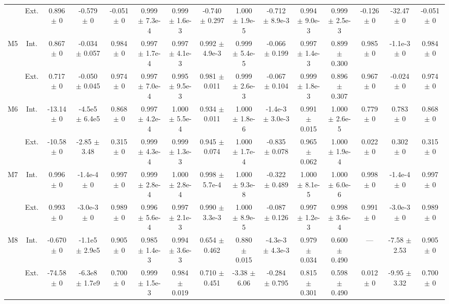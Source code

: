 \begin{table}[htbp]
{\begin{tabular}{@{}ccccccccccccccc@{}}
 & Ext. & 0.896 $\pm$ 0 & -0.579 $\pm$ 0 & -0.051 $\pm$ 0 & 0.999 $\pm$ 7.3e-4 & 0.999 $\pm$ 1.6e-3 & -0.740 $\pm$ 0.297 & 1.000 $\pm$ 1.9e-5 & -0.712 $\pm$ 8.9e-3 & 0.994 $\pm$ 9.0e-3 & 0.999 $\pm$ 2.5e-3 & -0.126 $\pm$ 0 & -32.47 $\pm$ 0 & -0.051 $\pm$ 0 \\
\cline{2-15}
\multirow{2}{*}{M5} & Int. & 0.867 $\pm$ 0 & -0.034 $\pm$ 0.057 & 0.984 $\pm$ 0 & 0.997 $\pm$ 1.7e-4 & 0.997 $\pm$ 4.1e-3 & 0.992 $\pm$ 4.9e-3 & 0.999 $\pm$ 5.4e-5 & -0.066 $\pm$ 0.199 & 0.997 $\pm$ 1.4e-3 & 0.899 $\pm$ 0.300 & 0.985 $\pm$ 0 & -1.1e-3 $\pm$ 0 & 0.984 $\pm$ 0 \\
 & Ext. & 0.717 $\pm$ 0 & -0.050 $\pm$ 0.045 & 0.974 $\pm$ 0 & 0.997 $\pm$ 7.0e-4 & 0.995 $\pm$ 9.5e-3 & 0.981 $\pm$ 0.011 & 0.999 $\pm$ 2.6e-3 & -0.067 $\pm$ 0.104 & 0.999 $\pm$ 1.8e-3 & 0.896 $\pm$ 0.307 & 0.967 $\pm$ 0 & -0.024 $\pm$ 0 & 0.974 $\pm$ 0 \\
\cline{2-15}
\multirow{2}{*}{M6} & Int. & -13.14 $\pm$ 0 & -4.5e5 $\pm$ 6.4e5 & 0.868 $\pm$ 0 & 0.997 $\pm$ 4.2e-4 & 1.000 $\pm$ 5.5e-4 & 0.934 $\pm$ 0.011 & 1.000 $\pm$ 1.8e-6 & -1.4e-3 $\pm$ 3.0e-3 & 0.991 $\pm$ 0.015 & 1.000 $\pm$ 2.6e-5 & 0.779 $\pm$ 0 & 0.783 $\pm$ 0 & 0.868 $\pm$ 0 \\
 & Ext. & -10.58 $\pm$ 0 & -2.85 $\pm$ 3.48 & 0.315 $\pm$ 0 & 0.999 $\pm$ 4.3e-4 & 0.999 $\pm$ 1.3e-3 & 0.945 $\pm$ 0.074 & 1.000 $\pm$ 1.7e-4 & -0.835 $\pm$ 0.078 & 0.965 $\pm$ 0.062 & 1.000 $\pm$ 1.9e-4 & 0.022 $\pm$ 0 & 0.302 $\pm$ 0 & 0.315 $\pm$ 0 \\
\cline{2-15}
\multirow{2}{*}{M7} & Int. & 0.996 $\pm$ 0 & -1.4e-4 $\pm$ 0 & 0.997 $\pm$ 0 & 0.999 $\pm$ 2.8e-4 & 1.000 $\pm$ 2.8e-4 & 0.998 $\pm$ 5.7e-4 & 1.000 $\pm$ 9.3e-8 & -0.322 $\pm$ 0.489 & 1.000 $\pm$ 8.1e-5 & 1.000 $\pm$ 6.0e-6 & 0.998 $\pm$ 0 & -1.4e-4 $\pm$ 0 & 0.997 $\pm$ 0 \\
 & Ext. & 0.993 $\pm$ 0 & -3.0e-3 $\pm$ 0 & 0.989 $\pm$ 0 & 0.996 $\pm$ 5.6e-4 & 0.997 $\pm$ 2.1e-3 & 0.990 $\pm$ 3.3e-3 & 1.000 $\pm$ 8.9e-5 & -0.087 $\pm$ 0.126 & 0.997 $\pm$ 1.2e-3 & 0.998 $\pm$ 3.6e-4 & 0.991 $\pm$ 0 & -3.0e-3 $\pm$ 0 & 0.989 $\pm$ 0 \\
\cline{2-15}
\multirow{2}{*}{M8} & Int. & -0.670 $\pm$ 0 & -1.1e5 $\pm$ 2.9e5 & 0.905 $\pm$ 0 & 0.985 $\pm$ 1.4e-3 & 0.994 $\pm$ 3.6e-3 & 0.654 $\pm$ 0.462 & 0.880 $\pm$ 0.015 & -4.3e-3 $\pm$ 4.3e-3 & 0.979 $\pm$ 0.034 & 0.600 $\pm$ 0.490 & --- & -7.58 $\pm$ 2.53 & 0.905 $\pm$ 0 \\
 & Ext. & -74.58 $\pm$ 0 & -6.3e8 $\pm$ 1.7e9 & 0.700 $\pm$ 0 & 0.999 $\pm$ 1.5e-3 & 0.984 $\pm$ 0.019 & 0.710 $\pm$ 0.451 & -3.38 $\pm$ 6.06 & -0.284 $\pm$ 0.795 & 0.815 $\pm$ 0.301 & 0.598 $\pm$ 0.490 & 0.012 $\pm$ 0 & -9.95 $\pm$ 3.32 & 0.700 $\pm$ 0 \\

\end{tabular}}
\end{table}
